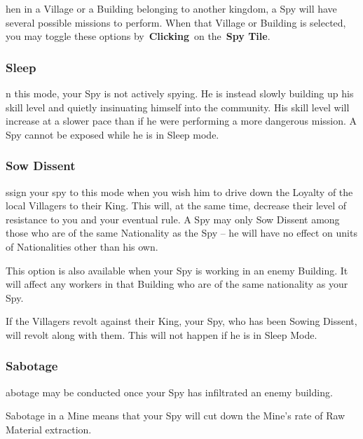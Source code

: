 hen in a Village or a Building belonging to another kingdom, a Spy will have several possible missions to perform. When that Village or Building is selected, you may toggle these options by \textbf{Clicking} on the \textbf{Spy Tile}.

\subsubsection{Sleep}


n this mode, your Spy is not actively spying. He is instead slowly building up his skill level and quietly insinuating himself into the community. His skill level will increase at a slower pace than if he were performing a more dangerous mission. A Spy cannot be exposed while he is in Sleep mode.

\subsubsection{Sow Dissent}


ssign your spy to this mode when you wish him to drive down the Loyalty of the local Villagers to their King. This will, at the same time, decrease their level of resistance to you and your eventual rule. A Spy may only Sow Dissent among those who are of the same Nationality as the Spy -- he will have no effect on units of Nationalities other than his own.

This option is also available when your Spy is working in an enemy Building. It will affect any workers in that Building who are of the same nationality as your Spy.

If the Villagers revolt against their King, your Spy, who has been Sowing Dissent, will revolt along with them. This will not happen if he is in Sleep Mode.

\subsubsection{Sabotage}


abotage may be conducted once your Spy has infiltrated an enemy building.

Sabotage in a Mine means that your Spy will cut down the Mine’s rate of Raw Material extraction.

